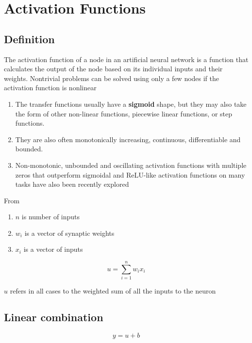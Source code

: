 \chapter{Activation Functions}\label{chapter: Activation Functions}

\section{Definition \cite{wiki-Artificial_neuron, wiki-activation-fn}}

The activation function of a node in an artificial neural network is a function that calculates the output of the node based on its individual inputs and their weights. Nontrivial problems can be solved using only a few nodes if the activation function is nonlinear

\vspace{0.2cm}
\begin{enumerate}
    \item  The transfer functions usually have a \textbf{sigmoid} shape, but they may also take the form of other non-linear functions, piecewise linear functions, or step functions.
    \item They are also often monotonically increasing, continuous, differentiable and bounded. 
    \item  Non-monotonic, unbounded and oscillating activation functions with multiple zeros that outperform sigmoidal and ReLU-like activation functions on many tasks have also been recently explored
\end{enumerate}

\vspace{0.2cm}
\noindent From \cite{wiki-Artificial_neuron} \\

\begin{enumerate}
    \item $n$ is number of inputs
    \item $w_i$ is a vector of synaptic weights
    \item $x_i$ is a vector of inputs
\end{enumerate}
\[
    u=\sum _{i=1}^{n}w_{i}x_{i}
\]

$u$ refers in all cases to the weighted sum of all the inputs to the neuron


\section{Linear combination \cite{wiki-Artificial_neuron}}
\[
    y = u + b
\]

